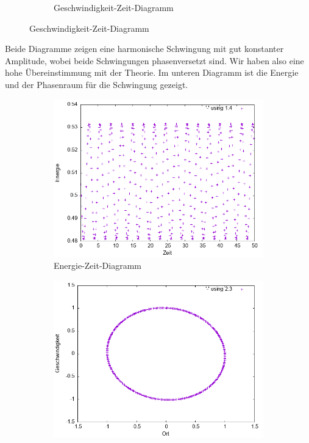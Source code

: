 \documentclass[
    oneside,
    ngerman,
    footinclude=false,
    captions=tableheading,
    DIV=12
]{scrartcl}
\begin{document}
\begin{figure}[H]
\begin{subfigure}[b]{0.45\textwidth}
                        \caption{Geschwindigkeit-Zeit-Diagramm}
                        \label{fig:expEulerA1(a)-01-0-v}
                    \end{subfigure}
               \end{figure}
               Beide Diagramme zeigen eine harmonische Schwingung mit gut konstanter Amplitude, wobei beide Schwingungen phasenversetzt sind. Wir haben also eine hohe Übereinstimmung mit der Theorie. Im unteren Diagramm ist die Energie und der Phasenraum für die Schwingung gezeigt.
               
               \begin{figure}[H]
                \centering
                \begin{subfigure}[b]{0.45\textwidth}
                    \centering
                    \includegraphics[width=\textwidth]{Bilddateien/expEulerA1(a)-01-E.png}
                    \caption{Energie-Zeit-Diagramm}
                    \label{fig:expEulerA1(a)-01-0-E}
                \end{subfigure}
                \hfill
                \begin{subfigure}[b]{0.45\textwidth}
                    \centering
                    \includegraphics[width=\textwidth]{Bilddateien/expEulerA1(a)-01-0-xv.png}

\end{subfigure}
\end{figure}
\end{document}
